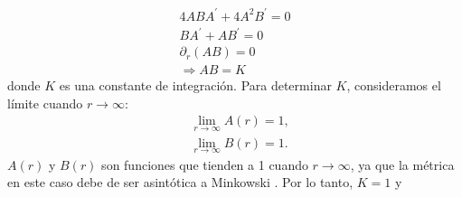 \begin{equation}
    \begin{aligned}
        4 A B A^{\prime} + 4 A^2 B^{\prime} = 0 \\
        B A^{\prime}+A B^{\prime}=0 \\
        \partial_r(A B)=0 \\
        \Rightarrow A B=K
    \end{aligned}
\end{equation}
donde \( K \) es una constante de integración. Para determinar \( K \), consideramos el límite cuando \( r \to \infty \):
\begin{equation}
    \begin{aligned}
         & \lim_{ r \to \infty} A(r) = 1, \\
         & \lim_{ r \to \infty} B(r) =   1.
    \end{aligned}
\end{equation}
$A(r)$ y $B(r)$ son funciones que tienden a 1 cuando \( r \to \infty \), ya que la métrica en este caso debe de ser asintótica  a Minkowski . Por lo tanto, \( K = 1 \) y

